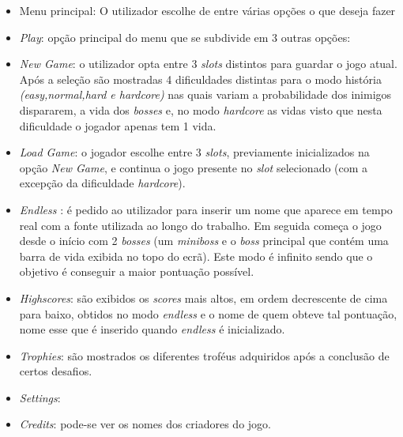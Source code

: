 \documentclass[a4paper,11pt]{article}
\newcommand\tabitem{\setlength{\itemindent}{1cm}}
\begin{document}
\begin{itemize}
    \item Menu principal: O utilizador escolhe de entre várias opções o que deseja fazer
    \tabitem
    \item \textit{Play}: opção principal do menu que se subdivide em 3 outras opções:
    \item \textit{New Game}: o utilizador opta entre 3 \textit{slots} distintos para guardar o jogo atual. Após a seleção são mostradas 4 dificuldades distintas para o modo história\textit{ (easy,normal,hard e hardcore)} nas quais variam a probabilidade dos inimigos dispararem, a vida dos \textit{bosses} e, no modo \textit{hardcore} as vidas visto que nesta dificuldade o jogador apenas tem 1 vida.

    \item \textit{Load Game}: o jogador escolhe entre 3 \textit{slots}, previamente inicializados na opção \textit{New Game}, e continua o jogo presente no \textit{slot} selecionado (com a excepção da dificuldade \textit{hardcore}).

    \item   \textit{Endless} : é pedido ao utilizador para inserir um nome que aparece em tempo real com a fonte utilizada ao longo do trabalho. Em seguida começa o jogo desde o início com 2 \textit{bosses} (um \textit{miniboss} e o \textit{boss} principal que contém uma barra de vida exibida no topo do ecrã). Este modo é infinito sendo que o objetivo é conseguir a maior pontuação possível.

    \item  \textit{Highscores}: são exibidos os \textit{scores }mais altos, em ordem decrescente de cima para baixo, obtidos no modo \textit{endless} e o nome de quem obteve tal pontuação, nome esse que é inserido quando \textit{endless} é inicializado.
    
    \item \textit{Trophies}: são mostrados os diferentes troféus adquiridos após a conclusão de certos desafios. 
    
    \item \textit{Settings}: 
    
    \item \textit{Credits}: pode-se ver os nomes dos criadores do jogo. 
    
\end{itemize}
	    
      

        
                 
\end{document}
